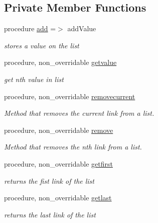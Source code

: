 \subsection*{Private Member Functions}
\begin{DoxyCompactItemize}
\item 
procedure \mbox{\hyperlink{structabstract__linkedlist__mod_1_1linkedlist_a691374958da432e733453e6feb895bb1}{add}} =$>$ add\+Value
\begin{DoxyCompactList}\small\item\em stores a value on the list \end{DoxyCompactList}\item 
procedure, non\+\_\+overridable \mbox{\hyperlink{structabstract__linkedlist__mod_1_1linkedlist_a5c7d60d9f9213b87eed9ce5350a72460}{getvalue}}
\begin{DoxyCompactList}\small\item\em get nth value in list \end{DoxyCompactList}\item 
procedure, non\+\_\+overridable \mbox{\hyperlink{structabstract__linkedlist__mod_1_1linkedlist_a7bca8c31961be692d5c377c309d6cbd2}{removecurrent}}
\begin{DoxyCompactList}\small\item\em Method that removes the current link from a list. \end{DoxyCompactList}\item 
procedure, non\+\_\+overridable \mbox{\hyperlink{structabstract__linkedlist__mod_1_1linkedlist_a8d5f5b478ec685dfdc93cb491d2d30f9}{remove}}
\begin{DoxyCompactList}\small\item\em Method that removes the nth link from a list. \end{DoxyCompactList}\item 
procedure, non\+\_\+overridable \mbox{\hyperlink{structabstract__linkedlist__mod_1_1linkedlist_ae96f8c00f41925064249e443ce31f44a}{getfirst}}
\begin{DoxyCompactList}\small\item\em returns the fist link of the list \end{DoxyCompactList}\item 
procedure, non\+\_\+overridable \mbox{\hyperlink{structabstract__linkedlist__mod_1_1linkedlist_a17366518d094a62e8e68fa4c5681810c}{getlast}}
\begin{DoxyCompactList}\small\item\em returns the last link of the list \end{DoxyCompactList}\item 

\end{DoxyCompactItemize}
